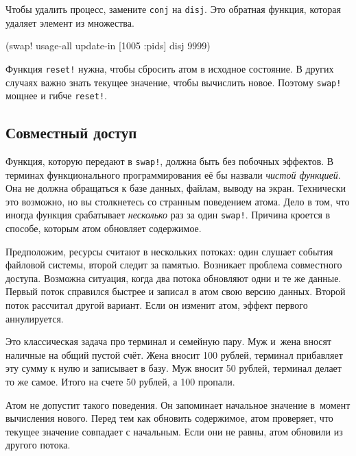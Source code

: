 \noindent
Чтобы удалить процесс, замените \verb|conj| на \verb|disj|. Это обратная
функция, которая удаляет элемент из множества.


\begin{english}
  \begin{clojure}
(swap! usage-all update-in [1005 :pids] disj 9999)
  \end{clojure}
\end{english}

Функция \verb|reset!| нужна, чтобы сбросить атом в исходное состояние. В
других случаях важно знать текущее значение, чтобы вычислить новое. Поэтому
\verb|swap!| мощнее и гибче \verb|reset!|.

\subsection{Совместный доступ}


Функция, которую передают в \verb|swap!|, должна быть без побочных эффектов. В
терминах функционального программирования её бы назвали \emph{чистой функцией}.
Она не должна обращаться к базе данных, файлам, выводу на экран. Технически
это возможно, но вы столкнетесь со странным поведением атома. Дело в том,
что иногда функция срабатывает \emph{несколько} раз за один \verb|swap!|.
Причина кроется в способе, которым атом обновляет содержимое.

Предположим, ресурсы считают в нескольких потоках: один слушает события файловой
системы, второй следит за памятью. Возникает проблема совместного
доступа. Возможна ситуация, когда два потока обновляют одни и те же
данные. Первый поток справился быстрее и записал в атом свою версию
данных. Второй поток рассчитал другой вариант. Если он изменит атом, эффект
первого аннулируется.


Это классическая задача про терминал и семейную пару. Муж и~жена вносят наличные
на общий пустой счёт. Жена вносит 100 рублей, терминал прибавляет эту сумму к
нулю и записывает в базу. Муж вносит 50 рублей, терминал делает то же
самое. Итого на счете 50 рублей, а 100 пропали.

Атом не допустит такого поведения. Он запоминает начальное значение в~момент
вычисления нового. Перед тем как обновить содержимое, атом проверяет, что
текущее значение совпадает с начальным. Если они не равны, атом обновили из
другого потока.

